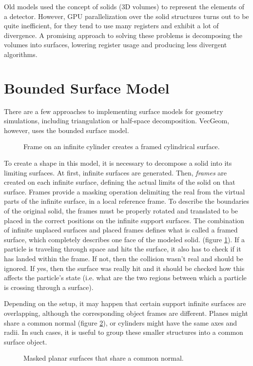 \documentclass[12pt, a4paper]{article}
\begin{document}
Old models used the concept of solids (3D volumes) to represent the elements of a detector. However, GPU parallelization over the solid structures turns out to be quite inefficient, for they tend to use many registers and exhibit a lot of divergence. A promising approach to solving these problems is decomposing the volumes into surfaces, lowering register usage and producing less divergent algorithms.


\section{Bounded Surface Model}

There are a few approaches to implementing surface models for geometry simulations, including triangulation or half-space decomposition. VecGeom, however, uses the bounded surface model.
\begin{figure}[h!]
	\centering
	
	\caption{Frame on an infinite cylinder creates a framed cylindrical surface.}
	\label{fig:mask}
\end{figure}

To create a shape in this model, it is necessary to decompose a solid into its limiting surfaces. At first, infinite surfaces are generated. Then, \textit{frames} are created on each infinite surface, defining the actual limits of the solid on that surface. Frames provide a masking operation delimiting the real from the virtual parts of the infinite surface, in a local reference frame. To describe the boundaries of the original solid, the frames must be properly rotated and translated to be placed in the correct positions on the infinite support surfaces. The combination of infinite unplaced surfaces and placed frames defines what is called a framed surface, which completely describes one face of the modeled solid. (figure \ref{fig:mask}). If a particle is traveling through space and hits the surface, it also has to check if it has landed within the frame. If not, then the collision wasn't real and should be ignored. If yes, then the surface was really hit and it should be checked how this affects the particle's state (i.e. what are the two regions between which a particle is crossing through a surface).

Depending on the setup, it may happen that certain support infinite surfaces are overlapping, although the corresponding object frames are different. Planes might share a common normal (figure \ref{fig:commonSurf}), or cylinders might have the same axes and radii. In such cases, it is useful to group these smaller structures into a common surface object.
\begin{figure}[h!]
	\centering
	
	\caption{Masked planar surfaces that share a common normal.}
	\label{fig:commonSurf}
\end{figure}
\end{document}
